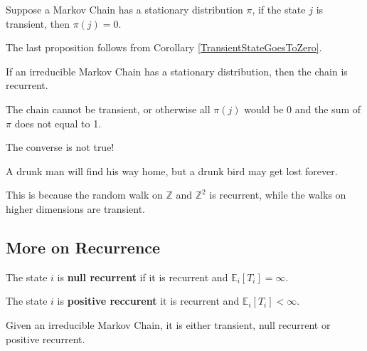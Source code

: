     \begin{proposition}
        Suppose a Markov Chain has a stationary distribution $\pi$, if the state $j$ is transient, then $\pi(j) = 0$.
    \end{proposition}
    The last proposition follows from Corollary \ref{TransientStateGoesToZero}.

    \begin{corollary}
        If an irreducible Markov Chain has a stationary distribution, then the chain is recurrent.
    \end{corollary}
    \begin{sketchproof}
        The chain cannot be transient, or otherwise all $\pi(j)$ would be 0 and the sum of $\pi$ does not equal to 1.
    \end{sketchproof}
    \begin{remark}
        The converse is not true!
    \end{remark}

    \begin{proposition}
        A drunk man will find his way home, but a drunk bird may get lost forever.
    \end{proposition}
    This is because the random walk on $\mathbb{Z}$ and $\mathbb{Z}^2$ is recurrent, while the walks on higher dimensions are transient.

    \subsection{More on Recurrence}
    \begin{definition}
        The state $i$ is \textbf{null recurrent} if it is recurrent and $\mathbb{E}_i[T_i] = \infty$.
    \end{definition}
    \begin{definition}
        The state $i$ is \textbf{positive reccurent} it is recurrent and $\mathbb{E}_i[T_i] < \infty$.
    \end{definition}

    \begin{proposition}
        Given an irreducible Markov Chain, it is either transient, null recurrent or positive recurrent.
    \end{proposition}



